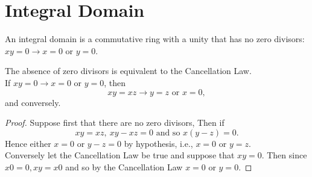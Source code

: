 \section{Integral Domain}
An integral domain is a commutative ring with a unity that has no zero divisors: $xy = 0 \rightarrow x = 0 \mbox{  or  } y = 0$. 

\begin{theorem} The absence of zero divisors is equivalent to the Cancellation Law. \\

If $xy = 0 \rightarrow x = 0 \mbox{  or  } y = 0$, then \[ xy = xz \rightarrow y = z \mbox{  or  } x = 0,\] and conversely.
\end{theorem}
\begin{proof}
Suppose first that there are no zero divisors, Then if 
\[ xy = xz,  ~xy - xz = 0 \mbox{  and so  } x(y - z) = 0.\]
Hence either $x=0$ or $y-z = 0$ by hypothesis, i.e., $x = 0$ or $y = z$. \\

Conversely let the Cancellation Law be true and suppose that $xy = 0$. Then since $x0 = 0, xy = x0$ and so by the Cancellation Law
$x = 0 \mbox{  or  } y = 0$. 
\end{proof}